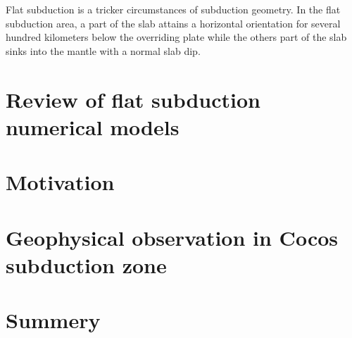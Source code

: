 Flat subduction is a tricker circumstances of subduction geometry. In the flat subduction area, a part of the slab attains a horizontal orientation for several hundred kilometers below the overriding plate while the others part of the slab sinks into the mantle with a normal slab dip.



\section{Review of flat subduction numerical models}



\section{Motivation}

\section{Geophysical observation in Cocos subduction zone}

\section{Summery}
